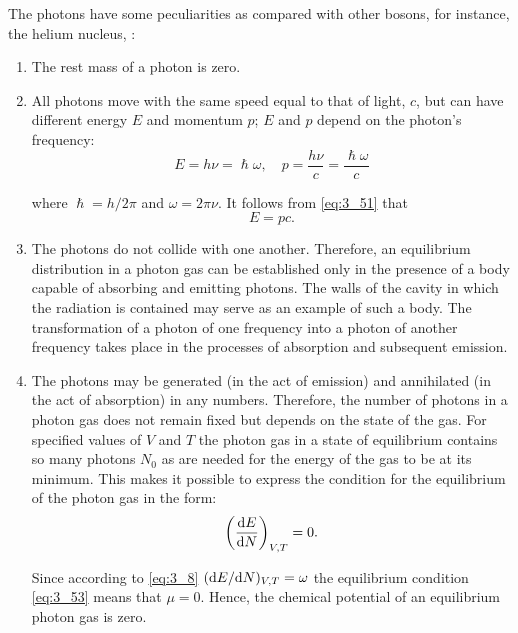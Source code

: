 The photons have some peculiarities as compared with other bosons, for instance, the helium nucleus, :
\begin{enumerate}[(1)]
    \item The rest mass of a photon is zero.

    \item All photons move with the same speed equal to that of light, $c$, but can have different energy $E$ and momentum $p$; $E$ and $p$ depend on the photon's frequency:
    \begin{equation}\label{eq:3_51}
        E = h\nu = \hslash\omega,\quad p = \frac{h\nu}{c} = \frac{\hslash\omega}{c}
    \end{equation}

    \noindent
    where $\hslash=h/2\pi$ and $\omega=2\pi\nu$. It follows from \eqref{eq:3_51} that
    \begin{equation}\label{eq:3_52}
        E = pc.
    \end{equation}

    \item The photons do not collide with one another. Therefore, an equilibrium distribution in a photon gas can be established only in the presence of a body capable of absorbing and emitting photons. The walls of the cavity in which the radiation is contained may serve as an example of such a body. The transformation of a photon of one frequency into a photon of another frequency takes place in the processes of absorption and subsequent emission.

    \item The photons may be generated (in the act of emission) and annihilated (in the act of absorption) in any numbers. Therefore, the number of photons in a photon gas does not remain fixed but depends on the state of the gas. For specified values of $V$ and $T$ the photon gas in a state of equilibrium contains so many photons $N_0$ as are needed for the energy of the gas to be at its minimum. This makes it possible to express the condition for the equilibrium of the photon gas in the form:
    \begin{equation}\label{eq:3_53}
        \left(\dfrac{\mathrm{d} E}{\mathrm{d} N}\right)_{V,T} = 0.
    \end{equation}

    \noindent
    Since according to \eqref{eq:3_8} $(\mathrm{d} E/\mathrm{d} N)_{V,T}=\omega$ the equilibrium condition \eqref{eq:3_53} means that $\mu=0$. Hence, the chemical potential of an equilibrium photon gas is zero.
\end{enumerate}

